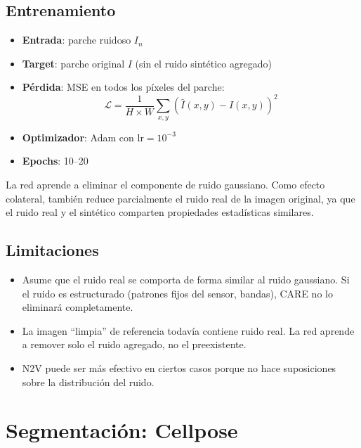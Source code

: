 \documentclass[11pt,a4paper]{article}
\begin{document}
\subsection{Entrenamiento}

\begin{itemize}
  \item \textbf{Entrada}: parche ruidoso $I_n$
  \item \textbf{Target}: parche original $I$ (sin el ruido sint\'{e}tico agregado)
  \item \textbf{P\'{e}rdida}: MSE en todos los p\'{i}xeles del parche:
  \begin{equation}
    \mathcal{L} = \frac{1}{H \times W} \sum_{x,y} \left( \hat{I}(x,y) - I(x,y) \right)^2
  \end{equation}
  \item \textbf{Optimizador}: Adam con $\text{lr} = 10^{-3}$
  \item \textbf{Epochs}: 10--20
\end{itemize}

La red aprende a eliminar el componente de ruido gaussiano. Como efecto colateral, tambi\'{e}n reduce parcialmente el ruido real de la imagen original, ya que el ruido real y el sint\'{e}tico comparten propiedades estad\'{i}sticas similares.

\subsection{Limitaciones}

\begin{itemize}
  \item Asume que el ruido real se comporta de forma similar al ruido gaussiano. Si el ruido es estructurado (patrones fijos del sensor, bandas), CARE no lo eliminar\'{a} completamente.
  \item La imagen ``limpia'' de referencia todav\'{i}a contiene ruido real. La red aprende a remover solo el ruido agregado, no el preexistente.
  \item N2V puede ser m\'{a}s efectivo en ciertos casos porque no hace suposiciones sobre la distribuci\'{o}n del ruido.
\end{itemize}

\section{Segmentaci\'{o}n: Cellpose}
\label{sec:cellpose}
\end{document}
